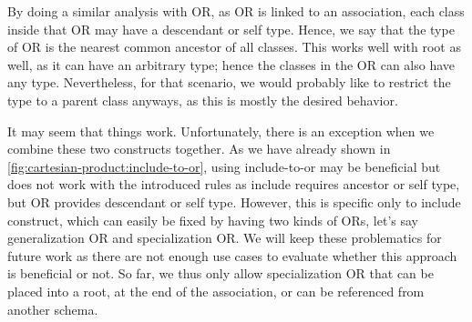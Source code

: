 \bigskip

By doing a similar analysis with OR, as OR is linked to an association, each class inside that OR may have a descendant or self type. Hence, we say that the type of OR is the nearest common ancestor of all classes. This works well with root as well, as it can have an arbitrary type; hence the classes in the OR can also have any type. Nevertheless, for that scenario, we would probably like to restrict the type to a parent class anyways, as this is mostly the desired behavior.

It may seem that things work. Unfortunately, there is an exception when we combine these two constructs together. As we have already shown in \autoref{fig:cartesian-product:include-to-or}, using include-to-or may be beneficial but does not work with the introduced rules as include requires ancestor or self type, but OR provides descendant or self type. However, this is specific only to include construct, which can easily be fixed by having two kinds of ORs, let's say generalization OR and specialization OR. We will keep these problematics for future work as there are not enough use cases to evaluate whether this approach is beneficial or not. So far, we thus only allow specialization OR that can be placed into a root, at the end of the association, or can be referenced from another schema.


